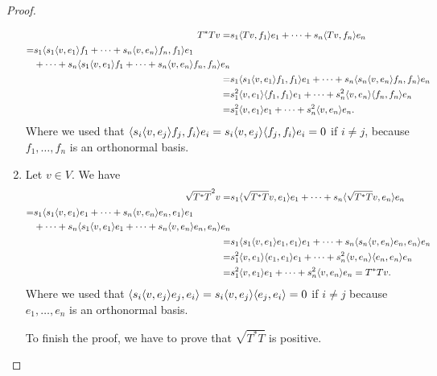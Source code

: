 \begin{proof}
\begin{enumerate}
     \begin{align*}
         T^\ast Tv 
         =& s_1\langle Tv,f_1\rangle e_1+\dots+s_n\langle Tv,f_n\rangle e_n\\
        \begin{split}
             =& s_1\langle s_1\langle v,e_1\rangle f_1+\dots+s_n\langle v,e_n\rangle f_n,f_1\rangle e_1\\
             &+\dots+s_n\langle s_1\langle v,e_1\rangle f_1+\dots+s_n\langle v,e_n\rangle f_n,f_n\rangle e_n
        \end{split}\\
        =& s_1\langle s_1\langle v,e_1\rangle f_1,f_1\rangle e_1+\dots+s_n\langle s_n\langle v,e_n\rangle f_n,f_n\rangle e_n\\
        =& s_1^2\langle v,e_1\rangle\langle f_1,f_1\rangle e_1+\dots+s_n^2\langle v,e_n\rangle\langle f_n,f_n\rangle e_n\\
        =& s_1^2\langle v,e_1\rangle e_1+\dots+s_n^2\langle v,e_n\rangle e_n.
     \end{align*}
     Where we used that $\langle s_i\langle v,e_j\rangle f_j,f_i\rangle e_i =s_i\langle v,e_j\rangle\langle f_j,f_i\rangle e_i =0$ if $i\neq j$, because $f_1,\dots,f_n$ is an orthonormal basis.
     \item Let $v\in V$. We have
     \begin{align*}
         \sqrt{T^\ast T}^2v =& s_1\langle \sqrt{T^\ast T}v,e_1\rangle e_1+\dots+s_n\langle \sqrt{T^\ast T}v,e_n\rangle e_n\\
         \begin{split}
             =& s_1\langle s_1\langle v,e_1\rangle e_1+\dots+s_n\langle v,e_n\rangle e_n,e_1\rangle e_1\\
             &+\dots+ s_n\langle s_1\langle v,e_1\rangle e_1+\dots+s_n\langle v,e_n\rangle e_n,e_n\rangle e_n
         \end{split}\\
        =& s_1\langle s_1\langle v,e_1\rangle e_1,e_1\rangle e_1 +\dots+ s_n\langle s_n\langle v,e_n\rangle e_n,e_n\rangle e_n\\
        =& s_1^2\langle v,e_1\rangle\langle e_1,e_1\rangle e_1 +\dots+ s_n^2\langle v,e_n\rangle\langle e_n,e_n\rangle e_n\\
        =& s_1^2\langle v,e_1\rangle e_1 +\dots+ s_n^2\langle v,e_n\rangle e_n =T^\ast Tv.
     \end{align*}
     Where we used that $\langle s_i\langle v,e_j\rangle e_j,e_i\rangle =s_i\langle v,e_j\rangle\langle e_j,e_i\rangle =0$ if $i\neq j$ because $e_1,\dots,e_n$ is an orthonormal basis.

     To finish the proof, we have to prove that $\sqrt{T^\ast T}$ is positive. 


\end{enumerate}
\end{proof}
